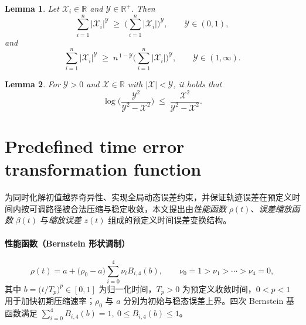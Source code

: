 \documentclass[pdflatex,sn-mathphys-num]{sn-jnl}%
\theoremstyle{thmstyleone}%
\newtheorem{lemma}{Lemma}[section]
\theoremstyle{thmstyletwo}%
\theoremstyle{thmstylethree}%
\begin{document}
	\begin{lemma}\label{lemma:3} \cite{HardyLittlewoodPolya_1952_Inequalities}
	Let $\mathcal{X}_i\in\mathbb{R}$ and $\mathcal{Y}\in\mathbb{R}^+$. Then
	\begin{equation}\label{eq:11}
	  \sum_{i=1}^{n}|\mathcal{X}_i|^{\mathcal{Y}}
	  \;\ge\;
	  \Big(\sum_{i=1}^{n}|\mathcal{X}_i|\Big)^{\mathcal{Y}},\qquad \mathcal{Y}\in(0,1),
	\end{equation}
	and
	\begin{equation}\label{eq:12}
	  \sum_{i=1}^{n}|\mathcal{X}_i|^{\mathcal{Y}}
	  \;\ge\;
	  n^{\,1-\mathcal{Y}}\Big(\sum_{i=1}^{n}|\mathcal{X}_i|\Big)^{\mathcal{Y}},
	  \qquad \mathcal{Y}\in(1,\infty).
	\end{equation}
	\end{lemma}
	
	\begin{lemma}\label{lemma:4} \cite{TeeEtAl_2009_Barrierlyapunov}
	For $\mathcal{Y}>0$ and $\mathcal{X}\in\mathbb{R}$ with $|\mathcal{X}|<\mathcal{Y}$, it holds that
	\begin{equation}\label{eq:13}
	  \log\!\Big(\frac{\mathcal{Y}^{2}}{\mathcal{Y}^{2}-\mathcal{X}^{2}}\Big)
	  \;\le\;
	  \frac{\mathcal{X}^{2}}{\mathcal{Y}^{2}-\mathcal{X}^{2}}.
	\end{equation}
	\end{lemma}
	


	\section{Predefined time error transformation function}

	为同时化解初值越界奇异性、实现全局动态误差约束，并保证轨迹误差在预定义时间内按可调路径被合法压缩与稳定收敛，本文提出由\emph{性能函数} $\rho(t)$、\emph{误差缩放函数} $\beta(t)$ 与\emph{缩放误差} $z(t)$ 组成的预定义时间误差变换结构。
	
	\paragraph{性能函数（Bernstein 形状调制）}
	\begin{equation}\label{eq:14}
	  \rho(t) = a + \big(\rho_0 - a\big)\sum_{i=0}^4 \nu_i B_{i,4}(b), 
	  \qquad \nu_0 = 1 > \nu_1 > \cdots > \nu_4 = 0,
	\end{equation}
	其中 $b = \big(t/T_p\big)^{p}\in[0,1]$ 为归一化时间，$T_p>0$ 为预定义收敛时间，$0<p<1$ 用于加快初期压缩速率；$\rho_0$ 与 $a$ 分别为初始与稳态误差上界。四次 Bernstein 基函数满足 $\sum_{i=0}^{4} B_{i,4}(b)=1,\ 0\le B_{i,4}(b)\le 1$。
	
\end{document}
